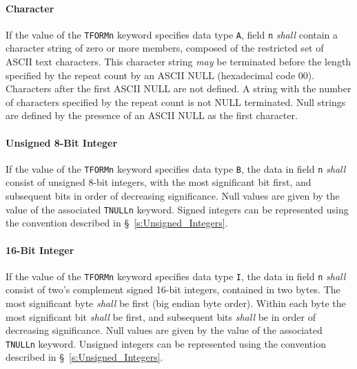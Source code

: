 \documentclass[11pt,makeidx]{book}     %
\begin{document}
    \paragraph{Character}
    If the value of the {\tt TFORMn} keyword specifies 
    data type {\tt A}, field {\tt n} 
    {\em shall} contain a character string of 
    zero or more members, 
    composed of the restricted set of ASCII text characters.
    This character string {\em may}
    be terminated before the length specified by   
    the repeat count by 
    an ASCII NULL (hexadecimal code 00).  
    Characters after the first ASCII NULL are not defined.
    A string with the number of characters 
    specified by the repeat count is not 
    NULL terminated. 
    Null strings are defined by the presence of
    an ASCII NULL as the first character. 

    \paragraph{Unsigned 8-Bit Integer} 
    If the value of 
    the {\tt TFORMn} keyword specifies data type {\tt B}, the 
    data in field {\tt n} {\em shall} consist of unsigned 8-bit integers, 
    with the most significant bit first, and 
    subsequent bits in order of decreasing significance. 
    Null values are given by the value of the 
    associated {\tt TNULLn} keyword.
    Signed integers can be represented using the convention described 
    in \S~\ref{s:Unsigned_Integers}.

    \paragraph{16-Bit Integer} 
    If the value of 
    the {\tt TFORMn} keyword specifies data type {\tt I}, the 
    data in field {\tt n} {\em shall} consist
    of two's complement signed 16-bit integers, 
    contained in two bytes.
    The most significant byte {\em shall} be first (big endian byte order).
    Within each byte the 
    most significant bit {\em shall} be first, and 
    subsequent bits {\em shall} be in order of decreasing significance.     
    Null values are given by the value of the 
    associated {\tt TNULLn} keyword.
    Unsigned integers can be represented using the convention described 
    in \S~\ref{s:Unsigned_Integers}.
\end{document}
